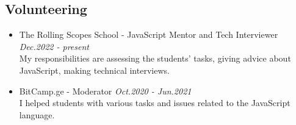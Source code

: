 \documentclass[10pt,letterpaper]{article}
\begin{document}
\subsection*{Volunteering}
 \begin{itemize}
    \parskip=-1em
      \vspace{0.05em}

\item[]
    {{The Rolling Scopes School - JavaScript Mentor and Tech Interviewer}}
     \hfill
     \emph{Dec.2022 - present}
    \\ My responsibilities are assessing the students' tasks, giving advice about JavaScript, making technical interviews.
\\
    \item[]
    {{BitCamp.ge - Moderator}}
     \hfill
     \emph{Oct.2020 - Jun.2021}
    \\ I helped students with various tasks and issues related to the JavaScript language.
  


  
\end{itemize}
  
\end{document}
